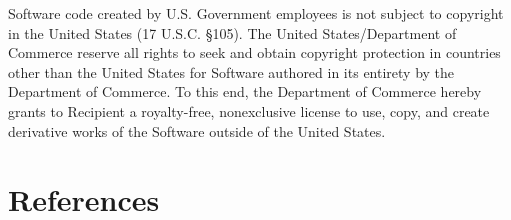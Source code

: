 \documentclass[
  letterpaper,
  oneside,
  open=any]{scrbook}
\begin{document}
Software code created by U.S. Government employees is not subject to
copyright in the United States (17 U.S.C. §105). The United
States/Department of Commerce reserve all rights to seek and obtain
copyright protection in countries other than the United States for
Software authored in its entirety by the Department of Commerce. To this
end, the Department of Commerce hereby grants to Recipient a
royalty-free, nonexclusive license to use, copy, and create derivative
works of the Software outside of the United States.


\chapter*{References}\label{references-1}

\end{document}
